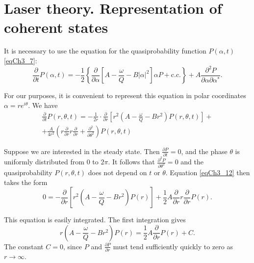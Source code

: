 \section{Laser theory. Representation of coherent states}
It is necessary to use the equation for the quasiprobability function
$P\left(\alpha, t\right)$ \eqref{eqCh3_7}:
\begin{equation}
\frac{\partial}{\partial t} P\left(\alpha, t\right) = 
- \frac{1}{2}\left\{ 
\frac{\partial}{\partial \alpha}
\left[
A - \frac{\omega}{Q} - B \left|\alpha\right|^2
\right] \alpha P + \mbox{c.c.}
\right\} + 
A \frac{\partial^2 P}{\partial \alpha \partial \alpha^{*}}.
\nonumber
\end{equation} 

For our purposes, it is convenient to represent this equation in polar
coordinates $\alpha = r e^{i\theta}$. We have
\begin{eqnarray}
\frac{\partial}{\partial t} P\left(r, \theta, t\right) =
- \frac{1}{2 r} \cdot \frac{\partial}{\partial r}\left[
r^2\left(A - \frac{\omega}{Q} - B r^2\right)P\left(r, \theta,
t\right) 
\right] +
\nonumber \\
+ \frac{A}{4 r^2}
\left(
r \frac{\partial}{\partial r} r \frac{\partial}{\partial r} + 
\frac{\partial^2}{\partial \theta^2}
\right)
P\left(r, \theta, t\right)
\label{eqCh3_12}
\end{eqnarray}

Suppose we are interested in the steady state. Then $\frac{\partial
  P}{\partial t} = 0$, and the phase $\theta$ is uniformly distributed from $0$ to $2
\pi$. It follows that $\frac{\partial^2 P}{\partial
  \theta^2} = 0$ and the quasiprobability $P\left(r, \theta, t\right)$ does not depend on $t$ or
$\theta$. Equation \eqref{eqCh3_12} then takes the form   
\begin{equation}
0 = - \frac{\partial}{\partial r}
\left[
r^2\left(A - \frac{\omega}{Q} - B r^2\right)P\left(r\right) 
\right] + 
\frac{1}{2} A \frac{\partial}{\partial r} r \frac{\partial}{\partial
  r} P\left(r\right).
\label{eqCh3_13}
\end{equation}

This equation is easily integrated. The first integration gives
\begin{equation}
r\left(A - \frac{\omega}{Q} - B r^2\right)P\left(r\right) 
=
\frac{1}{2} A \frac{\partial}{\partial
  r} P\left(r\right) + C.
\label{eqCh3_14}
\end{equation}
The constant $C = 0$, since $P$ and $\frac{\partial P}{\partial r}$
must tend sufficiently quickly to zero as $r \rightarrow
\infty$. 
 
